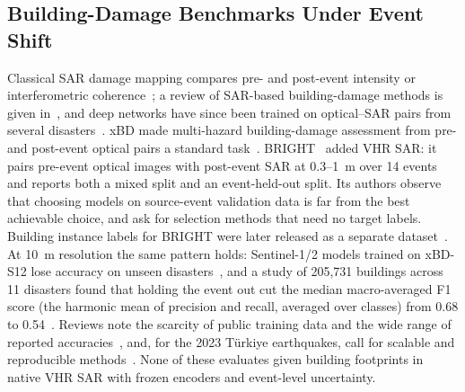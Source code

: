 \documentclass[journal]{IEEEtran}
\begin{document}
\subsection{Building-Damage Benchmarks Under Event Shift}
Classical SAR damage mapping compares pre- and post-event intensity or interferometric coherence~\cite{matsuoka2004sar,plank2014rapid}; a review of SAR-based building-damage methods is given in~\cite{ge2020review}, and deep networks have since been trained on optical--SAR pairs from several disasters~\cite{adriano2021multimodal}. xBD made multi-hazard building-damage assessment from pre- and post-event optical pairs a standard task~\cite{gupta2019xbd}. BRIGHT~\cite{chen2025bright} added VHR SAR: it pairs pre-event optical images with post-event SAR at 0.3--1~m over 14 events and reports both a mixed split and an event-held-out split. Its authors observe that choosing models on source-event validation data is far from the best achievable choice, and ask for selection methods that need no target labels. Building instance labels for BRIGHT were later released as a separate dataset~\cite{chen2026brightzenodo}. At 10~m resolution the same pattern holds: Sentinel-1/2 models trained on xBD-S12 lose accuracy on unseen disasters~\cite{dietrich2026copernicus}, and a study of 205,731 buildings across 11 disasters found that holding the event out cut the median macro-averaged F1 score (the harmonic mean of precision and recall, averaged over classes) from 0.68 to 0.54~\cite{currie2026transfer}. Reviews note the scarcity of public training data and the wide range of reported accuracies~\cite{wang2024review}, and, for the 2023 T\"urkiye earthquakes, call for scalable and reproducible methods~\cite{taskin2026lessons,voelker2024eefit}. None of these evaluates given building footprints in native VHR SAR with frozen encoders and event-level uncertainty.
\end{document}
